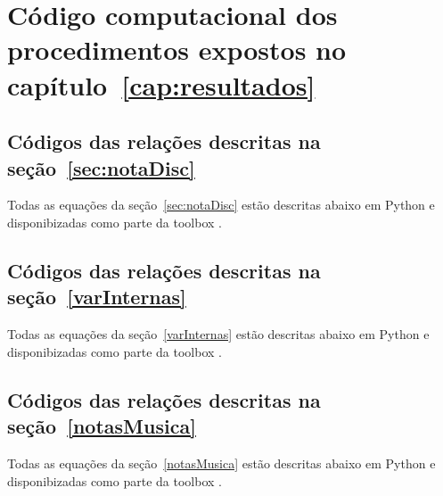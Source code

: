 \chapter{Código computacional dos procedimentos expostos no capítulo~\ref{cap:resultados}}
\label{cap:codigoProc}

\section{Códigos das relações descritas na seção~\ref{sec:notaDisc}}\label{sec:cod1}
Todas as equações da seção~\ref{sec:notaDisc} estão descritas abaixo em Python e disponibizadas como parte da toolbox \massa.






\section{Códigos das relações descritas na seção~\ref{varInternas}}\label{sec:cod2}
Todas as equações da seção~\ref{varInternas} estão descritas abaixo em Python e disponibizadas como parte da toolbox \massa.





\section{Códigos das relações descritas na seção~\ref{notasMusica}}\label{sec:cod3}
Todas as equações da seção~\ref{notasMusica} estão descritas abaixo em Python e disponibizadas como parte da toolbox \massa.


